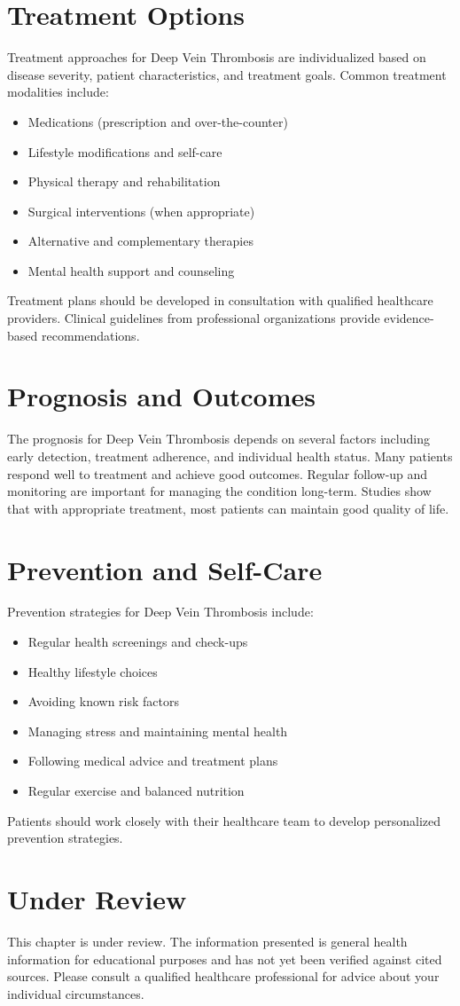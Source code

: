 \section*{Treatment Options}
Treatment approaches for Deep Vein Thrombosis are individualized based on disease severity, patient characteristics, and treatment goals. Common treatment modalities include:
\begin{itemize}
  \item Medications (prescription and over-the-counter)
  \item Lifestyle modifications and self-care
  \item Physical therapy and rehabilitation
  \item Surgical interventions (when appropriate)
  \item Alternative and complementary therapies
  \item Mental health support and counseling
\end{itemize}
Treatment plans should be developed in consultation with qualified healthcare providers. Clinical guidelines from professional organizations provide evidence-based recommendations.

\section*{Prognosis and Outcomes}
The prognosis for Deep Vein Thrombosis depends on several factors including early detection, treatment adherence, and individual health status. Many patients respond well to treatment and achieve good outcomes. Regular follow-up and monitoring are important for managing the condition long-term. Studies show that with appropriate treatment, most patients can maintain good quality of life.

\section*{Prevention and Self-Care}
Prevention strategies for Deep Vein Thrombosis include:
\begin{itemize}
  \item Regular health screenings and check-ups
  \item Healthy lifestyle choices
  \item Avoiding known risk factors
  \item Managing stress and maintaining mental health
  \item Following medical advice and treatment plans
  \item Regular exercise and balanced nutrition
\end{itemize}
Patients should work closely with their healthcare team to develop personalized prevention strategies.
\section*{Under Review}
This chapter is under review. The information presented is general health information for educational purposes and has not yet been verified against cited sources. Please consult a qualified healthcare professional for advice about your individual circumstances.


\clearpage
